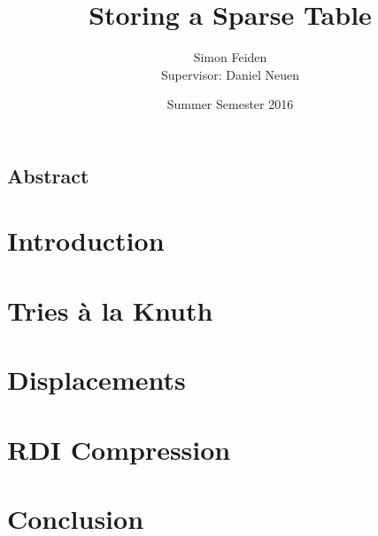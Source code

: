 \documentclass[12pt]{article}
\title{Storing a Sparse Table}
\date{Summer Semester 2016}
\author{Simon Feiden\\Supervisor: Daniel Neuen}
\begin{document}
\maketitle
\thispagestyle{empty}

\vspace*{2em}

\begin{center}
	\begin{minipage}[t]{0.8\textwidth}
		\section*{Abstract} %
		
	\end{minipage}
\end{center}
\newpage



\section*{Introduction}




\section*{Tries à la Knuth}




\section*{Displacements}




\section*{RDI Compression}




\section*{Conclusion}

\newpage




\end{document}
